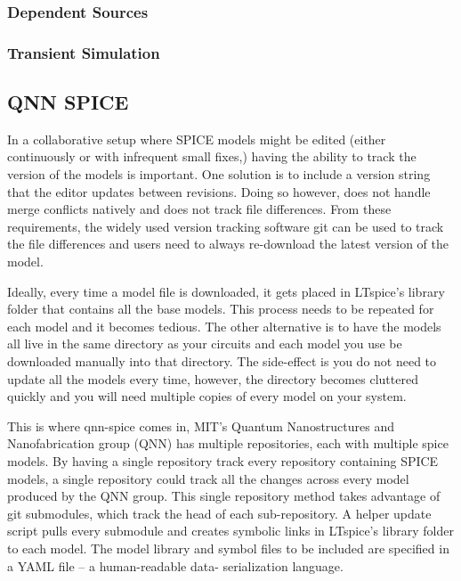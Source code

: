 \documentclass{article}
\begin{document}


\subsubsection{Dependent Sources}

\subsubsection{Transient Simulation}




\subsection{QNN SPICE}

In a collaborative setup where SPICE models might be edited (either continuously or with infrequent small fixes,) 
having the ability to track the version of the models is important. One solution is to include a version 
string that the editor updates between revisions. Doing so however, does not handle merge conflicts natively and
does not track file differences. From these requirements, the widely used version tracking software git can be
used to track the file differences and users need to always re-download the latest version of the model.

Ideally, every time a model file is downloaded, it gets placed in LTspice's library folder that contains all the base 
models. This process needs to be repeated for each model and it becomes tedious. The other alternative is to have
the models all live in the same directory as your circuits and each model you use be downloaded manually into
that directory. The side-effect is you do not need to update all the models every time, however, the directory becomes
cluttered quickly and you will need multiple copies of every model on your system.

This is where qnn-spice comes in, MIT's Quantum Nanostructures and Nanofabrication group (QNN) has multiple
repositories, each with multiple spice models. By having a single repository track every repository containing
SPICE models, a single repository could track all the changes across every model produced by the QNN group. 
This single repository method takes advantage of git submodules, which track the head of each sub-repository.
A helper update script pulls every submodule and creates symbolic links in LTspice's library folder to each model.
The model library and symbol files to be included are specified in a YAML file -- a human-readable data-
serialization language.
\end{document}
